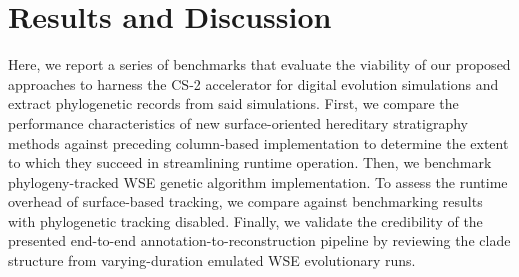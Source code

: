 \section{Results and Discussion} \label{sec:results}

Here, we report a series of benchmarks that evaluate the viability of our proposed approaches to harness the CS-2 accelerator for digital evolution simulations and extract phylogenetic records from said simulations.
First, we compare the performance characteristics of new surface-oriented hereditary stratigraphy methods against preceding column-based implementation to determine the extent to which they succeed in streamlining runtime operation.
Then, we benchmark phylogeny-tracked WSE genetic algorithm implementation.
To assess the runtime overhead of surface-based tracking, we compare against benchmarking results with phylogenetic tracking disabled.
Finally, we validate the credibility of the presented end-to-end annotation-to-reconstruction pipeline by reviewing the clade structure from varying-duration emulated WSE evolutionary runs.


% 



